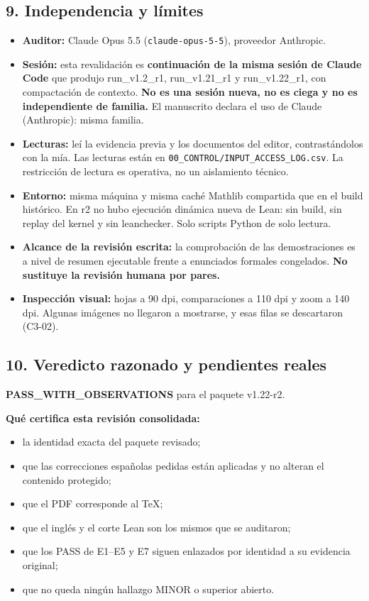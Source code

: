 \documentclass[
]{article}
\providecommand{\tightlist}{%
  \setlength{\itemsep}{0pt}\setlength{\parskip}{0pt}}
\begin{document}
\subsection{9. Independencia y
límites}\label{9-independencia-y-luxedmites}

\begin{itemize}
\tightlist
\item
  \textbf{Auditor:} Claude Opus 5.5 (\texttt{claude-opus-5-5}),
  proveedor Anthropic.
\item
  \textbf{Sesión:} esta revalidación es \textbf{continuación de la misma
  sesión de Claude Code} que produjo run\_v1.2\_r1, run\_v1.21\_r1 y
  run\_v1.22\_r1, con compactación de contexto. \textbf{No es una sesión
  nueva, no es ciega y no es independiente de familia.} El manuscrito
  declara el uso de Claude (Anthropic): misma familia.
\item
  \textbf{Lecturas:} leí la evidencia previa y los documentos del
  editor, contrastándolos con la mía. Las lecturas están en
  \texttt{00\_CONTROL/INPUT\_ACCESS\_LOG.csv}. La restricción de lectura
  es operativa, no un aislamiento técnico.
\item
  \textbf{Entorno:} misma máquina y misma caché Mathlib compartida que
  en el build histórico. En r2 no hubo ejecución dinámica nueva de Lean:
  sin build, sin replay del kernel y sin leanchecker. Solo scripts
  Python de solo lectura.
\item
  \textbf{Alcance de la revisión escrita:} la comprobación de las
  demostraciones es a nivel de resumen ejecutable frente a enunciados
  formales congelados. \textbf{No sustituye la revisión humana por
  pares.}
\item
  \textbf{Inspección visual:} hojas a 90 dpi, comparaciones a 110 dpi y
  zoom a 140 dpi. Algunas imágenes no llegaron a mostrarse, y esas filas
  se descartaron (C3-02).
\end{itemize}

\subsection{10. Veredicto razonado y pendientes
reales}\label{10-veredicto-razonado-y-pendientes-reales}

\textbf{PASS\_WITH\_OBSERVATIONS} para el paquete v1.22-r2.

\textbf{Qué certifica esta revisión consolidada:}

\begin{itemize}
\tightlist
\item
  la identidad exacta del paquete revisado;
\item
  que las correcciones españolas pedidas están aplicadas y no alteran el
  contenido protegido;
\item
  que el PDF corresponde al TeX;
\item
  que el inglés y el corte Lean son los mismos que se auditaron;
\item
  que los PASS de E1--E5 y E7 siguen enlazados por identidad a su
  evidencia original;
\item
  que no queda ningún hallazgo MINOR o superior abierto.
\end{itemize}
\end{document}
